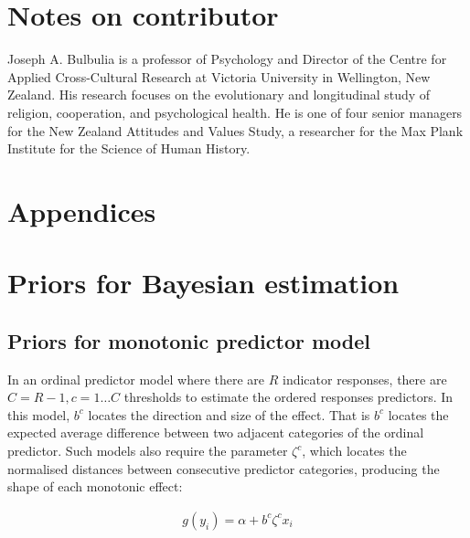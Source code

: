 \documentclass[]{interact}
\theoremstyle{plain}%
\theoremstyle{definition}
\theoremstyle{remark}
\begin{document}
\section*{Notes on contributor}
 Joseph A. Bulbulia is a professor of Psychology and Director of the Centre for Applied Cross-Cultural Research at Victoria University in Wellington, New Zealand. His research focuses on the evolutionary and longitudinal study of religion, cooperation, and psychological health. He is one of four senior managers for the New Zealand Attitudes and Values Study, a researcher for the Max Plank Institute for the Science of Human History.%






\newpage
\section*{Appendices}

\appendix

\section{Priors for Bayesian estimation}
\label{app:priors}


\subsection{Priors for monotonic predictor model}

In an ordinal predictor model where there are $R$ indicator responses, there are $C = R-1, c = 1\dots C$ thresholds to estimate the ordered responses predictors. In this model, $b^c$ locates the direction and size of the effect. That is $b^c$ locates the expected average difference between two adjacent categories of the ordinal predictor. Such models also require the parameter $\zeta^c$, which locates the normalised distances between consecutive predictor categories, producing the shape of each monotonic effect:

$$
\begin{aligned}
g(y_i) = \alpha + b^c \zeta^c x_i
\end{aligned}
$$
\end{document}
